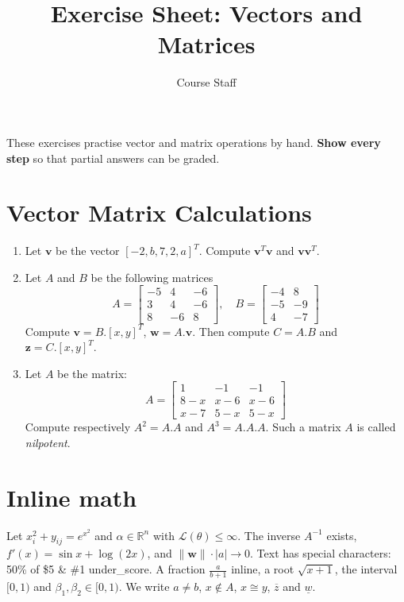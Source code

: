 \documentclass{article}
\title{Exercise Sheet: Vectors and Matrices}
\author{Course Staff}
\date{}
\begin{document}
\maketitle
These exercises practise vector and matrix operations by hand. \textbf{Show every step} so that partial answers can be graded.

\section{Vector Matrix Calculations}
\begin{enumerate}
\item Let $\mathbf{v}$ be the vector $[-2, b, 7, 2, a]^T$. Compute $\mathbf{v}^T\mathbf{v}$ and $\mathbf{v}\mathbf{v}^T$.
\item Let $A$ and $B$ be the following matrices
\[ A = \begin{bmatrix} -5 & 4 & -6 \\ 3 & 4 & -6 \\ 8 & -6 & 8 \end{bmatrix}, \quad B = \begin{bmatrix} -4 & 8 \\ -5 & -9 \\ 4 & -7 \end{bmatrix} \]
Compute $\mathbf{v} = B.[x,y]^T$, $\mathbf{w} = A.\mathbf{v}$. Then compute $C = A.B$ and $\mathbf{z} = C.[x,y]^T$.
\item Let $A$ be the matrix:
\[ A = \begin{bmatrix} 1 & -1 & -1 \\ 8-x & x-6 & x-6 \\ x-7 & 5-x & 5-x \end{bmatrix} \]
Compute respectively $A^2 = A.A$ and $A^3 = A.A.A$. Such a matrix $A$ is called \emph{nilpotent}.
\end{enumerate}

\section{Inline math}
Let $x_i^2 + y_{ij} = e^{x^2}$ and $\alpha \in \mathbb{R}^n$ with $\mathcal{L}(\theta) \leq \infty$.
The inverse $A^{-1}$ exists, $f'(x) = \sin x + \log(2x)$, and $\|\mathbf{w}\| \cdot |a| \to 0$.
Text has special characters: 50\% of \$5 \& \#1 under\_score.
A fraction $\frac{a}{b+1}$ inline, a root $\sqrt{x+1}$, the interval $[0, 1)$ and $\beta_1, \beta_2 \in [0, 1)$.
We write $a \neq b$, $x \notin A$, $x \cong y$, $\overline{z}$ and $\underline{w}$.
\newpage
\end{document}
